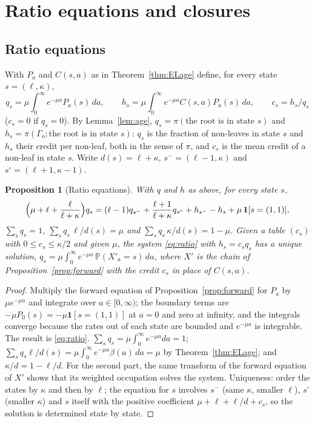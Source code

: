 \documentclass[11pt]{article}
\theoremstyle{plain}
\newtheorem{proposition}[theorem]{Proposition}
\theoremstyle{definition}
\theoremstyle{remark}
\begin{document}
\section{Ratio equations and closures}\label{sec:closures}

\subsection{Ratio equations}

With $P_a$ and $C(s,a)$ as in Theorem~\ref{thm:ELage} define, for every state $s=(\ell,\kappa)$,
\[
q_s=\mu\int_0^\infty e^{-\mu a}P_a(s)\,da,\qquad h_s=\mu\int_0^\infty e^{-\mu a}C(s,a)P_a(s)\,da,\qquad c_s=h_s/q_s
\]
($c_s=0$ if $q_s=0$). By Lemma~\ref{lem:age}, $q_s=\pi(\text{the root is in state }s)$ and $h_s=\pi(\Gamma_o;\text{the root is in state }s)$: $q_s$ is the fraction of non-leaves in state $s$ and $h_s$ their credit per non-leaf, both in the sense of $\pi$, and $c_s$ is the mean credit of a non-leaf in state $s$. Write $d(s)=\ell+\kappa$, $s^-=(\ell-1,\kappa)$ and $s^\circ=(\ell+1,\kappa-1)$.

\begin{proposition}[Ratio equations]\label{prop:ratio}
With $q$ and $h$ as above, for every state $s$,
\begin{equation}\label{eq:ratio}
\Bigl(\mu+\ell+\frac{\ell}{\ell+\kappa}\Bigr)q_{s}=(\ell-1)q_{s^-}+\frac{\ell+1}{\ell+\kappa}q_{s^\circ}+h_{s^-}-h_{s}+\mu\,\mathbf{1}[s=(1,1)],
\end{equation}
$\sum_sq_s=1$, $\sum_sq_s\,\ell/d(s)=\mu$ and $\sum_sq_s\,\kappa/d(s)=1-\mu$. Given a table $(c_s)$ with $0\le c_s\le\kappa/2$ and given $\mu$, the system \eqref{eq:ratio} with $h_s=c_sq_s$ has a unique solution, $q_s=\mu\int_0^\infty e^{-\mu a}\,\mathbb P(X'_a=s)\,da$, where $X'$ is the chain of Proposition~\ref{prop:forward} with the credit $c_s$ in place of $C(s,a)$.
\end{proposition}

\begin{proof}
Multiply the forward equation of Proposition~\ref{prop:forward} for $P_a$ by $\mu e^{-\mu a}$ and integrate over $a\in[0,\infty)$; the boundary terms are $-\mu P_0(s)=-\mu\mathbf 1[s=(1,1)]$ at $a=0$ and zero at infinity, and the integrals converge because the rates out of each state are bounded and $e^{-\mu a}$ is integrable. The result is \eqref{eq:ratio}. $\sum_sq_s=\mu\int_0^\infty e^{-\mu a}da=1$; $\sum_sq_s\ell/d(s)=\mu\int_0^\infty e^{-\mu a}\beta(a)\,da=\mu$ by Theorem~\ref{thm:ELage}; and $\kappa/d=1-\ell/d$. For the second part, the same transform of the forward equation of $X'$ shows that its weighted occupation solves the system. Uniqueness: order the states by $\kappa$ and then by $\ell$; the equation for $s$ involves $s^-$ (same $\kappa$, smaller $\ell$), $s^\circ$ (smaller $\kappa$) and $s$ itself with the positive coefficient $\mu+\ell+\ell/d+c_s$, so the solution is determined state by state.
\end{proof}
\end{document}
